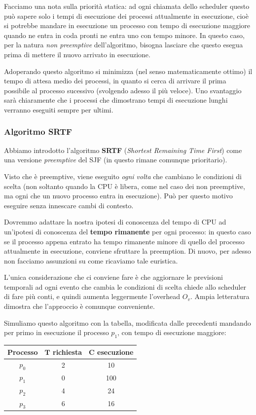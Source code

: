\documentclass[a4paper,11pt]{article}
\begin{document}
\par\smallskip

Facciamo una nota sulla priorità statica: ad ogni chiamata dello scheduler questo può sapere solo i tempi di esecuzione dei processi attualmente in esecuzione, cioè si potrebbe mandare in esecuzione un processo con tempo di esecuzione maggiore quando ne entra in coda pronti ne entra uno con tempo minore. 
In questo caso, per la natura \textit{non preemptive} dell'algoritmo, bisogna lasciare che questo esegua prima di mettere il nuovo arrivato in esecuzione.

Adoperando questo algoritmo si minimizza (nel senso matematicamente ottimo) il tempo di attesa medio dei processi, in quanto si cerca di arrivare il prima possibile al processo sucessivo (svolgendo adesso il più veloce).
Uno svantaggio sarà chiaramente che i processi che dimostrano tempi di esecuzione lunghi verranno eseguiti sempre per ultimi.

\subsubsection{Algoritmo SRTF}
Abbiamo introdotto l'algoritmo \textbf{SRTF} (\textit{Shortest Remaining Time First}) come una versione \textit{preemptive} del SJF (in questo rimane comunque prioritario).

Visto che è preemptive, viene eseguito \textit{ogni volta} che cambiano le condizioni di scelta (non soltanto quando la CPU è libera, come nel caso dei non preemptive, ma ogni che un nuovo processo entra in esecuzione).
Può per questo motivo eseguire senza innescare cambi di contesto.

Dovremmo adattare la nostra ipotesi di conoscenza del tempo di CPU ad un'ipotesi di conoscenza del \textbf{tempo rimanente} per ogni processo: in questo caso se il processo appena entrato ha tempo rimanente minore di quello del processo attualmente in esecuzione, conviene sfruttare la preemption.
Di nuovo, per adesso non facciamo assunzioni su come ricaviamo tale euristica.

L'unica considerazione che ci conviene fare è che aggiornare le previsioni temporali ad ogni evento che cambia le condizioni di scelta chiede allo scheduler di fare più conti, e quindi aumenta leggermente l'overhead $O_v$.
Ampia letteratura dimostra che l'approccio è comunque conveniente. 

\par\smallskip

Simuliamo questo algoritmo con la tabella, modificata dalle precedenti mandando per primo in esecuzione il processo $p_1$, con tempo di esecuzione maggiore:
\begin{table}[H]
	\center {}
	\begin{tabular} { c || c | c }
		\bfseries Processo & \bfseries $\mathbf{T}$ richiesta & \bfseries $\mathbf{C}$ esecuzione \\
		\hline
		$p_0$ & 2 & 10 \\ 
		$p_1$ & 0 & 100 \\ 
		$p_2$ & 4 & 24 \\ 
		$p_3$ & 6 & 16 
	\end{tabular}
\end{table}
\end{document}
